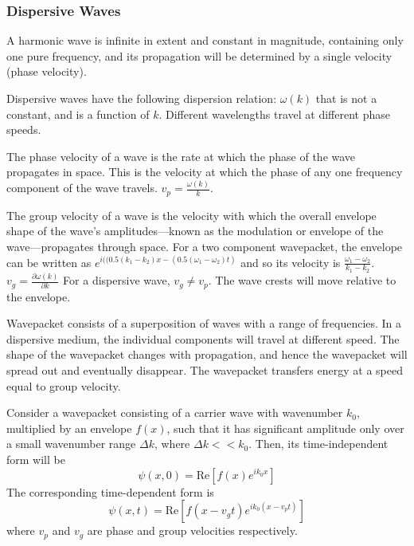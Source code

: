 \documentclass[a4paper]{article}
\begin{document}
\subsubsection*{Dispersive Waves}
\begin{defi}
A harmonic wave is infinite in extent and constant in magnitude, containing only one pure frequency, and its propagation will be determined by a single velocity (phase velocity). 
\end{defi}
\begin{defi}
Dispersive waves have the following dispersion relation: $\omega(k)$ that is not a constant, and is a function of $k$. Different wavelengths travel at different phase speeds.
\end{defi}
\begin{defi}
The phase velocity of a wave is the rate at which the phase of the wave propagates in space. This is the velocity at which the phase of any one frequency component of the wave travels. $v_p=\frac{\omega(k)}{k}$.
\end{defi}
\begin{defi}
The group velocity of a wave is the velocity with which the overall envelope shape of the wave's amplitudes—known as the modulation or envelope of the wave—propagates through space. For a two component wavepacket, the envelope can be written as $e^{i((0.5(k_1-k_2)x-(0.5(\omega_1-\omega_2)t)}$ and so its velocity is $\frac{\omega_1-\omega_2}{k_1-k_2}$. $v_g=\frac{\partial\omega(k)}{\partial k}$ For a dispersive wave, $v_g\neq v_p$. The wave crests will move relative to the envelope.
\end{defi}
\begin{defi}[Wavepacket]
Wavepacket consists of a superposition of waves with a range of frequencies. In a dispersive medium, the individual components will travel at different speed. The shape of the wavepacket changes with propagation, and hence the wavepacket will spread out and eventually disappear. The wavepacket transfers energy at a speed equal to group velocity.
\end{defi}
\begin{thm}
Consider a wavepacket consisting of a carrier wave with wavenumber $k_0$, multiplied by an envelope $f(x)$, such that it has significant amplitude only over a small wavenumber range $\Delta k$, where $\Delta k<<k_0$. Then, its time-independent form will be
$$\psi(x,0)=\text{Re}[f(x)e^{ik_0x}]$$
The corresponding time-dependent form is
$$\psi(x,t)=\text{Re}[f(x-v_gt)e^{ik_0(x-v_pt)}]$$
where $v_p$ and $v_g$ are phase and group velocities respectively. 
\end{thm}
\end{document}
